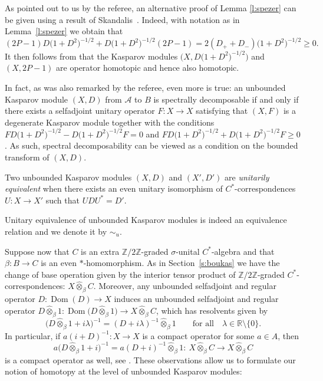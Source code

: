 \documentclass[11pt]{article}
\numberwithin{equation}{section}
\newcommand{\hot}{\widehat \otimes}
\newcommand{\zz}{\mathbb{Z}}
\newcommand{\rr}{\mathbb{R}}
\newcommand{\be}{\beta}
\newcommand{\la}{\lambda}
\newcommand{\si}{\sigma}
\newcommand{\s}[1]{\mathscr{#1}}
\newcommand{\sem}{\setminus}
\begin{document}
\begin{rem}As pointed out to us by the referee, an alternative proof of Lemma \ref{l:spezer} can be given using a result of Skandalis~\cite[Lemma~11]{Ska:SRK}. Indeed, with notation as in Lemma~\ref{l:spezer} we obtain that
\[
(2P-1) D\big(1 + D^2\big)^{-1/2} + D\big(1 + D^2\big)^{-1/2} (2P-1) = 2(D_+ + D_-)\big(1 + D^2\big)^{-1/2} \geq 0 .
\]
It then follows from \cite[Lemma~11]{Ska:SRK} that the Kasparov modules $\big(X,D\big(1 + D^2\big)^{-1/2}\big)$ and \mbox{$(X,2P-1)$} are operator homotopic and hence also homotopic.

In fact, as was also remarked by the referee, even more is true: an unbounded Kasparov module $(X,D)$ from $\s A$ to $B$ is spectrally decomposable if and only if there exists a selfadjoint unitary operator $F\colon X \to X$ satisfying that $(X,F)$ is a degenerate Kasparov module together with the conditions $F D\big(1+D^2\big)^{-1/2} - D\big(1+D^2\big)^{-1/2} F = 0$ and $F D\big(1+D^2\big)^{-1/2} + D\big(1+D^2\big)^{-1/2} F \geq 0$. As such, spectral decomposability can be viewed as a condition on the bounded transform of $(X,D)$.
\end{rem}

\begin{dfn}Two unbounded Kasparov modules $(X,D)$ and $(X',D')$ are \emph{unitarily equivalent} when there exists an even unitary isomorphism of $C^*$-correspondences $U\colon X \to X'$ such that $U D U^* = D'$.
\end{dfn}

Unitary equivalence of unbounded Kasparov modules is indeed an equivalence relation and we denote it by $\sim_u$.

Suppose now that $C$ is an extra $\zz/2\zz$-graded $\si$-unital $C^*$-algebra and that $\be\colon B \to C$ is an even $*$-homomorphism. As in Section~\ref{s:boukas} we have the change of base operation given by the interior tensor product of $\zz/2\zz$-graded $C^*$-correspondences: $X \hot_\be C$. Moreover, any unbounded selfadjoint and regular operator $D\colon \operatorname{Dom}(D) \to X$ induces an unbounded selfadjoint and regular operator $D \hot_\be 1\colon \operatorname{Dom}\big(D \hot_\be 1\big) \to X \hot_\be C$, which has resolvents given by
\[
\big( D \hot_\be 1 + i \la \big)^{-1} = (D + i \la)^{-1} \hot_\be 1 \qquad \text{for all} \quad \la \in \rr \sem \{0\} .
\]
In particular, if $a (i + D)^{-1}\colon X \to X$ is a compact operator for some $a \in A$, then
\[
a \big(D \hot_\be 1 + i\big)^{-1} = a (D + i)^{-1} \hot_\be 1\colon \ X \hot_\be C \to X \hot_\be C
\]
is a compact operator as well, see \cite[Proposition~4.7]{Lan:HCM}. These observations allow us to formulate our notion of homotopy at the level of unbounded Kasparov modules:
\end{document}

